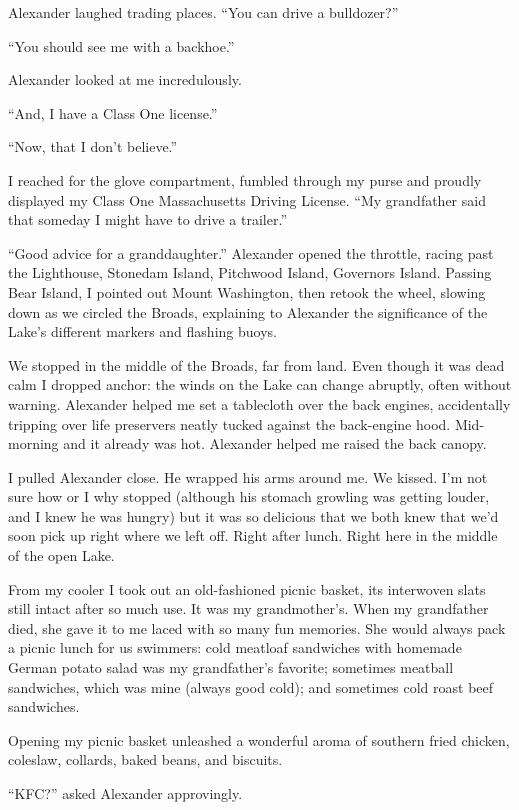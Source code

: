 Alexander laughed trading places. ``You can drive a bulldozer?''

``You should see me with a backhoe.''

Alexander looked at me incredulously.

``And, I have a Class One license.''

``Now, that I don't believe.''

I reached for the glove compartment, fumbled through my purse and
proudly displayed my Class One Massachusetts Driving License. ``My
grandfather said that someday I might have to drive a trailer.''

``Good advice for a granddaughter.'' Alexander opened the throttle,
racing past the Lighthouse, Stonedam Island, Pitchwood Island, Governors
Island. Passing Bear Island, I pointed out Mount Washington, then retook
the wheel, slowing down as we circled the Broads, explaining to
Alexander the significance of the Lake's different markers and flashing
buoys.

We stopped in the middle of the Broads, far from land. Even though it
was dead calm I dropped anchor: the winds on the Lake can change
abruptly, often without warning. Alexander helped me set a tablecloth
over the back engines, accidentally tripping over life preservers neatly
tucked against the back-engine hood. Mid-morning and it already was hot.
Alexander helped me raised the back canopy.

I pulled Alexander close. He wrapped his arms around me. We kissed. I'm
not sure how or I why stopped (although his stomach growling was getting
louder, and I knew he was hungry) but it was so delicious that we both
knew that we'd soon pick up right where we left off. Right after lunch.
Right here in the middle of the open Lake.

From my cooler I took out an old-fashioned picnic basket, its interwoven
slats still intact after so much use. It was my grandmother's. When my
grandfather died, she gave it to me laced with so many fun memories. She
would always pack a picnic lunch for us swimmers: cold meatloaf
sandwiches with homemade German potato salad was my grandfather's
favorite; sometimes meatball sandwiches, which was mine (always good
cold); and sometimes cold roast beef sandwiches.

Opening my picnic basket unleashed a wonderful aroma of southern fried
chicken, coleslaw, collards, baked beans, and biscuits.

``KFC?'' asked Alexander approvingly.

